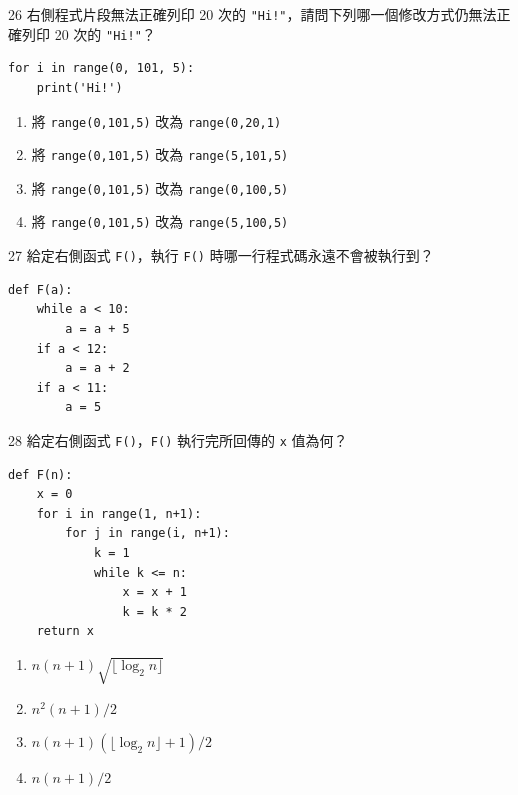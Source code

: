 \begin{qbox}{26}
右側程式片段無法正確列印 20 次的 \texttt{"Hi!"}，請問下列哪一個修改方式仍無法正確列印 20 次的 \texttt{"Hi!"}？

\begin{verbatim}
for i in range(0, 101, 5):
    print('Hi!')
\end{verbatim}

\begin{enumerate}[label=(\Alph*), itemsep=1pt, topsep=1pt, leftmargin=2.2em, parsep=0pt]
  \item 將 \texttt{range(0,101,5)} 改為 \texttt{range(0,20,1)}
  \item 將 \texttt{range(0,101,5)} 改為 \texttt{range(5,101,5)}
  \item 將 \texttt{range(0,101,5)} 改為 \texttt{range(0,100,5)}
  \item 將 \texttt{range(0,101,5)} 改為 \texttt{range(5,100,5)}
\end{enumerate}
\end{qbox}

\medskip

\begin{qbox}{27}
給定右側函式 \texttt{F()}，執行 \texttt{F()} 時哪一行程式碼永遠不會被執行到？

\begin{verbatim}
def F(a):
    while a < 10:
        a = a + 5
    if a < 12:
        a = a + 2
    if a < 11:
        a = 5
\end{verbatim}

\end{qbox}

\medskip

\begin{qbox}{28}
給定右側函式 \texttt{F()}，\texttt{F()} 執行完所回傳的 \texttt{x} 值為何？

\begin{verbatim}
def F(n):
    x = 0
    for i in range(1, n+1):
        for j in range(i, n+1):
            k = 1
            while k <= n:
                x = x + 1
                k = k * 2
    return x
\end{verbatim}

\begin{enumerate}[label=(\Alph*), itemsep=2pt, topsep=1pt, leftmargin=2.2em, parsep=0pt]
  \item $n(n+1)\sqrt{\lfloor\log_2 n\rfloor}$
  \item $n^2(n+1)/2$
  \item $n(n+1)(\lfloor\log_2 n\rfloor + 1)/2$
  \item $n(n+1)/2$
\end{enumerate}
\end{qbox}

